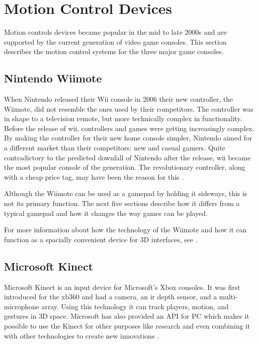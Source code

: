 

\section{Motion Control Devices}
Motion controls devices became popular in the mid to late  2000s and are supported by the current generation of video game consoles. This section describes the motion control systems for the three major game consoles.

\subsection{Nintendo Wiimote}
\label{wiimote}
When Nintendo released their Wii console in 2006 \cite{overmars2012} their new controller, the Wiimote, did not resemble the ones used by their competitors.
The controller was in shape to a television remote, but more technically complex in functionality.
Before the release of \gls{wii}, controllers and games were getting increasingly complex.
By making the controller for their new home console simpler, Nintendo aimed for a different market than their competitors: new and casual gamers.
Quite contradictory to the predicted downfall of Nintendo after the release, \gls{wii} became the most popular console of the generation.
The revolutionary controller, along with a cheap price tag, may have been the reason for this \cite{overmars2012}.

Although the Wiimote can be used as a gamepad by holding it sideways, this is not its primary function. %
The next five sections describe how it differs from a typical gamepad and how it changes the way games can be played. %

For more information about how the technology of the Wiimote and how it can function as a spacially convenient device for 3D interfaces, see \cite{lee2008hacking,wingrave2010wiimote}.

\subsection{Microsoft Kinect}
Microsoft Kinect is an input device for Microsoft's Xbox consoles.
It was first introduced for the \gls{xb360} and had a camera, an \gls{ir} depth sensor, and a multi-microphone array. %
Using this technology it can track players, motion, and gestures in 3D space. %
Microsoft has also provided an API for PC which makes it possible to use the Kinect for other purposes like research and even combining it with other technologies to create new innovations \cite{2015kinect}.

